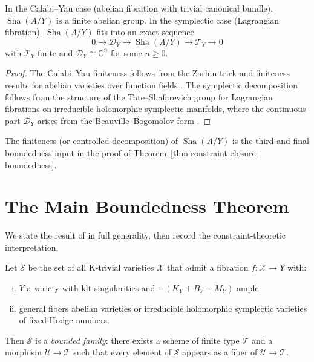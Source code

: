 \documentclass[11pt,openany]{book}
\newcommand{\Sha}{\operatorname{Sha}}
\begin{document}
\begin{proposition}
\label{prop:sha-finite}
In the Calabi--Yau case (abelian fibration with trivial
canonical bundle), $\Sha(A/Y)$ is a finite abelian group.
In the symplectic case (Lagrangian fibration), $\Sha(A/Y)$
fits into an exact sequence
\[
  0 \to \mathcal{D}_Y \to \Sha(A/Y) \to \mathcal{T}_Y \to 0
\]
with $\mathcal{T}_Y$ finite and $\mathcal{D}_Y \cong
\mathbb{C}^n$ for some $n \ge 0$.
\end{proposition}

\begin{proof}
The Calabi--Yau finiteness follows from the Zarhin trick
\citep{zarhin1977} and finiteness results for abelian
varieties over function fields
\citep{faltings1983,dolgachevgross1994}.  The symplectic
decomposition follows from the structure of the
Tate--Shafarevich group for Lagrangian fibrations on
irreducible holomorphic symplectic manifolds, where the
continuous part $\mathcal{D}_Y$ arises from the
Beauville--Bogomolov form \citep{beauville1983,huybrechts2003}.
\end{proof}

The finiteness (or controlled decomposition) of $\Sha(A/Y)$
is the third and final boundedness input in the proof of
Theorem~\ref{thm:constraint-closure-boundedness}.

\section{The Main Boundedness Theorem}
\label{sec:main-boundedness}

We state the result of \citep{engel2025} in full
generality, then record the constraint-theoretic
interpretation.

\begin{theorem}
\label{thm:engel-boundedness}
Let $\mathcal{S}$ be the set of all K-trivial varieties
$\mathcal{X}$ that admit a fibration
$f : \mathcal{X} \to Y$ with:
\begin{enumerate}[(i)]
  \item $Y$ a variety with klt singularities and
    $-(K_Y + B_Y + M_Y)$ ample;
  \item general fibers abelian varieties or irreducible
    holomorphic symplectic varieties of fixed Hodge
    numbers.
\end{enumerate}
Then $\mathcal{S}$ is a \emph{bounded family}: there exists
a scheme of finite type $\mathcal{T}$ and a morphism
$\mathcal{U} \to \mathcal{T}$ such that every element of
$\mathcal{S}$ appears as a fiber of $\mathcal{U} \to
\mathcal{T}$.
\end{theorem}
\end{document}
